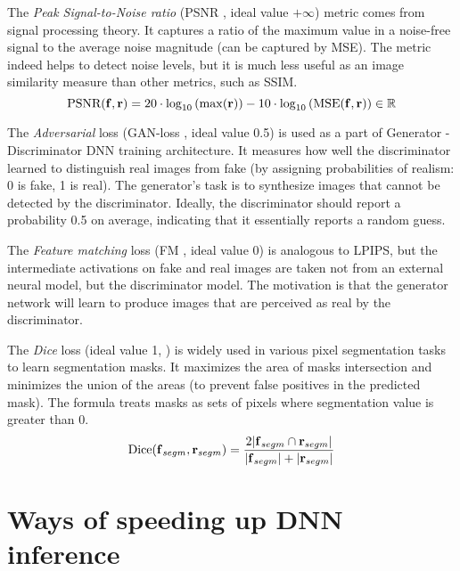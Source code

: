 	
The \textit{Peak Signal-to-Noise ratio} (PSNR \cite{metric:psnr13}, ideal value $+\infty$) metric comes from signal processing theory. It captures a ratio of the maximum value in a noise-free signal to the average noise magnitude (can be captured by MSE). The metric indeed helps to detect noise levels, but it is much less useful as an image similarity measure than other metrics, such as SSIM.
\begin{equation}
	\setlength\abovedisplayskip{0pt} 
	\text{PSNR}(\bmr{f}, \bmr{r}) = 20 \cdot \log_{10} \left( \max(\bmr{r}) \right) - 10 \cdot \log_{10}\left( \text{MSE}(\bmr{f}, \bmr{r}) \right) \in \mathbb{R} \setlength\belowdisplayskip{0pt} 
\end{equation}
	
The \textit{Adversarial} loss (GAN-loss \cite{dnn:gan14}, ideal value 0.5) is used as a part of Generator - Discriminator DNN training architecture. It measures how well the discriminator learned to distinguish real images from fake (by assigning probabilities of realism: 0 is fake, 1 is real). The generator's task is to synthesize images that cannot be detected by the discriminator. Ideally, the discriminator should report a probability 0.5 on average, indicating that it essentially reports a random guess.

The \textit{Feature matching} loss (FM \cite{metric:fm16}, ideal value 0) is analogous to LPIPS, but the intermediate activations on fake and real images are taken not from an external neural model, but the discriminator model. The motivation is that the generator network will learn to produce images that are perceived as real by the discriminator.

The \textit{Dice} loss (ideal value 1, \cite{metric:dice17}) is widely used in various pixel segmentation tasks to learn segmentation masks. It maximizes the area of masks intersection and minimizes the union of the areas (to prevent false positives in the predicted mask). The formula treats masks as sets of pixels where segmentation value is greater than 0.
\begin{equation}
	\setlength\abovedisplayskip{0pt} 
	\text{Dice}(\bmr{f}_{segm}, \bmr{r}_{segm}) = \frac{2 \lvert \bmr{f}_{segm} \cap \bmr{r}_{segm} \rvert}{ \lvert \bmr{f}_{segm} \rvert + \lvert \bmr{r}_{segm} \rvert} \setlength\belowdisplayskip{0pt} 
\end{equation}

\section{Ways of speeding up DNN inference}
\label{lit:dnn-speedup}


